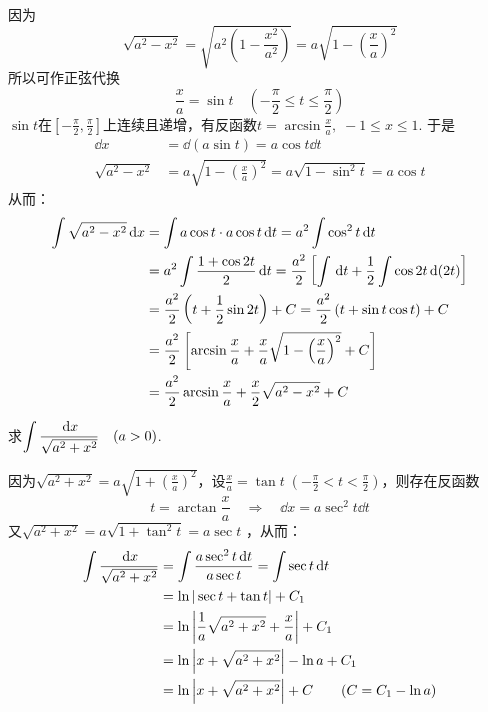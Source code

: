 \begin{solution}
因为\[\sqrt{a^2-x^2}=\sqrt{a^2\left(1-\frac{x^2}{a^2}\right)}=a\sqrt{1-\left(\frac{x}{a}\right)^2}\]
所以可作正弦代换
\[\frac{x}{a}=\sin t\quad \left(-\frac{\pi}{2}\le t\le \frac{\pi}{2}\right)\]
$\sin t$在$\left[-\frac{\pi}{2},\frac{\pi}{2}\right]$上连续且递增，有反函数$t=\arcsin\frac{x}{a},\; -1\le x\le 1$. 于是
\[\begin{split}
    \dd x&=\dd (a\sin t)=a\cos t\dd t\\
    \sqrt{a^2-x^2}&=a\sqrt{1-\left(\frac{x}{a}\right)^2}=a\sqrt{1-\sin^2 t}=a\cos t
\end{split}\]
从而：
\[\begin{split}
    \displaystyle\int \sqrt{a^2-x^2}\,{\rm d} x&=\int a\cos t\cdot a\cos t\,{\rm d} t=a^2\int \cos^2 t\,{\rm d} t\\ 
&=a^2\int \dfrac{1+\cos 2t}{2}\,{\rm d} t=\dfrac{a^2}{2}\left[\int \,{\rm d} t+\dfrac{1}{2}\int \cos 2t\,{\rm d} (2t)\right]\\
&=\dfrac{a^2}{2}\left(t+\dfrac{1}{2}\sin 2t\right)+C=\dfrac{a^2}{2}\left(t+\sin t\cos t\right)+C\\
&=\dfrac{a^2}{2}\left[\arcsin\dfrac{x}{a}+\dfrac{x}{a}\sqrt{1-\left(\dfrac{x}{a}\right)^2}+C\right]\\
&=\dfrac{a^2}{2}\arcsin\dfrac{x}{a}+\dfrac{x}{2}\sqrt{a^2-x^2}+C
\end{split}\]
\end{solution}

\begin{example}
    求$\displaystyle\int \dfrac{\,{\rm d} x}{\sqrt{a^2+x^2}}\quad (a>0)$.
\end{example}

\begin{solution}
因为$\sqrt{a^2+x^2}=a\sqrt{1+\left(\frac{x}{a}\right)^2}$，设$\frac{x}{a}=\tan t\; \left(-\frac{\pi}{2}<t<\frac{\pi}{2}\right)$，则存在反函数
\[t=\arctan\frac{x}{a}\quad \Rightarrow\quad \dd x=a\sec^2 t\dd t\]
又$\sqrt{a^2+x^2}=a\sqrt{1+\tan^2 t}=a\sec t$
，从而：
\[\begin{split}
    \displaystyle\int \dfrac{\,{\rm d} x}{\sqrt{a^2+x^2}}&=\int\dfrac{a\sec^2 t\,{\rm d} t}{a\sec t}=\int\sec t\,{\rm d} t\\
    &=\ln|\sec t+\tan t|+C_1\\
    &=\ln\left|\dfrac{1}{a}\sqrt{a^2+x^2}+\dfrac{x}{a}\right|+C_1\\
    &=\ln\left|x+\sqrt{a^2+x^2}\right|-\ln a+C_1\\
    &=\ln\left|x+\sqrt{a^2+x^2}\right|+C\qquad (C=C_1-\ln a)
\end{split}\]
\end{solution}

